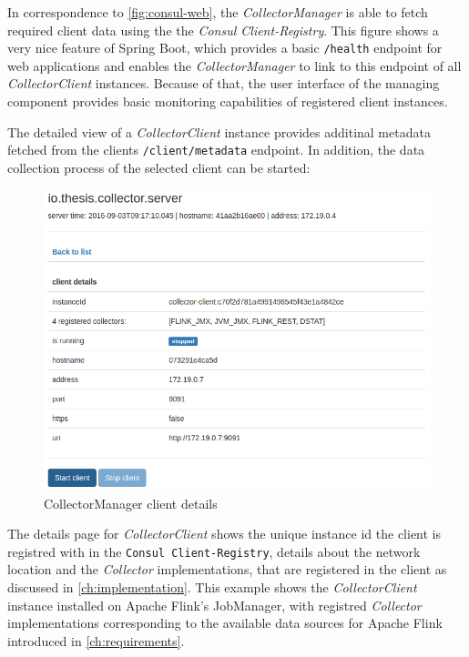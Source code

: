In correspondence to \autoref{fig:consul-web}, the \textit{CollectorManager} is able to fetch required client data using the the
\textit{Consul Client-Registry}. This figure shows a very nice feature of Spring Boot, which provides a basic \verb|/health| endpoint for web applications and enables the
\textit{CollectorManager} to link to this endpoint of all \textit{CollectorClient} instances. Because of that, the user interface
of the managing component provides basic monitoring capabilities of registered client instances.

The detailed view of a \textit{CollectorClient} instance provides additinal metadata fetched from the clients \verb|/client/metadata| endpoint.
In addition, the data collection process of the selected client can be started:

\begin{figure}[H]
	\centering
	\includegraphics[width=1.0\textwidth]{../images/10-cm-detail.png}
	\caption{CollectorManager client details}
	\label{fig:cm-details}
\end{figure}

The details page for \textit{CollectorClient} shows the unique instance id the client is registred with in the \verb|Consul Client-Registry|,
details about the network location and the \textit{Collector} implementations, that are registered in the client as discussed in
\autoref{ch:implementation}. This example shows the \textit{CollectorClient} instance installed on Apache Flink's JobManager,
with registred \textit{Collector} implementations corresponding to the available data sources for Apache Flink introduced in
\autoref{ch:requirements}.

